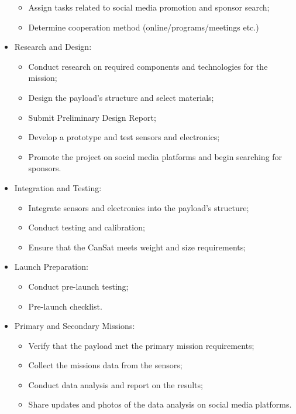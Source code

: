 \begin{itemize}[leftmargin=1cm, itemindent=0.25cm, noitemsep, topsep=0pt, label=$\bullet$]
\begin{itemize}[label=, noitemsep, topsep=0pt]
        \item Assign tasks related to social media promotion and sponsor search;
        \item Determine cooperation method (online/programs/meetings etc.)
    \end{itemize}
    \item Research and Design:
    \begin{itemize}[label=, noitemsep, topsep=0pt]
        \item Conduct research on required components and technologies for the mission;
        \item Design the payload's structure and select materials;
        \item Submit Preliminary Design Report;
        \item Develop a prototype and test sensors and electronics;
        \item Promote the project on social media platforms and begin searching for sponsors.
    \end{itemize}
    \item Integration and Testing:
    \begin{itemize}[label=, noitemsep, topsep=0pt]
        \item Integrate sensors and electronics into the payload's structure;
        \item Conduct testing and calibration;
        \item Ensure that the CanSat meets weight and size requirements;
    \end{itemize}
    \item Launch Preparation:
    \begin{itemize}[label=, noitemsep, topsep=0pt]
        \item Conduct pre-launch testing;
        \item Pre-launch checklist.
    \end{itemize}
    \item Primary and Secondary Missions:
    \begin{itemize}[label=, noitemsep, topsep=0pt]
        \item Verify that the payload met the primary mission requirements;
        \item Collect the missions data from the sensors;
        \item Conduct data analysis and report on the results;
        \item Share updates and photos of the data analysis on social media platforms.

\end{itemize}
\end{itemize}
